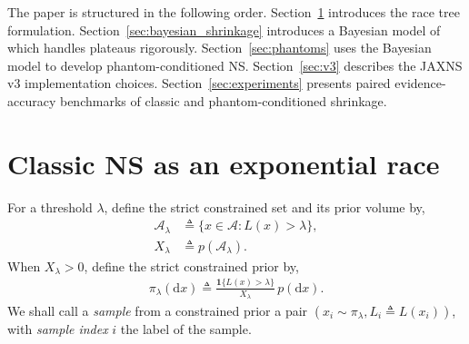 \documentclass[pdflatex,sn-basic,icol]{sn-jnl}
\newcommand{\dd}{\mathrm{d}}
\newcommand{\ind}{\mathbf{1}}
\theoremstyle{plain}
\theoremstyle{definition}
\begin{document}
The paper is structured in the following order.
Section~\ref{sec:strict_ns} introduces the race tree formulation.
Section~\ref{sec:bayesian_shrinkage} introduces a Bayesian model of which handles plateaus rigorously.
Section~\ref{sec:phantoms} uses the Bayesian model to develop phantom-conditioned NS.
Section~\ref{sec:v3} describes the JAXNS v3 implementation choices.
Section~\ref{sec:experiments} presents paired evidence-accuracy benchmarks of classic and phantom-conditioned shrinkage.

\section{Classic NS as an exponential race}
\label{sec:strict_ns}\label{sec:races}


For a threshold $\lambda$, define the strict constrained set and its prior volume by,
\begin{align}
    \mathcal{A}_\lambda &\triangleq \{x\in\mathcal{A}: L(x)>\lambda\},\\
    X_\lambda &\triangleq p(\mathcal{A}_\lambda).
    \label{eq:X_lambda}
\end{align}
When $X_\lambda>0$, define the strict constrained prior by,
\begin{align}
    \pi_\lambda(\dd x)
    \triangleq
    \frac{\ind\{L(x)>\lambda\}}{X_\lambda}\,p(\dd x).
    \label{eq:strict_constrained_prior}
\end{align}
We shall call a \textit{sample} from a constrained prior a pair $(x_i \sim \pi_\lambda, L_i\triangleq L(x_i))$, with \textit{sample index} $i$ the label of the sample.
\end{document}

